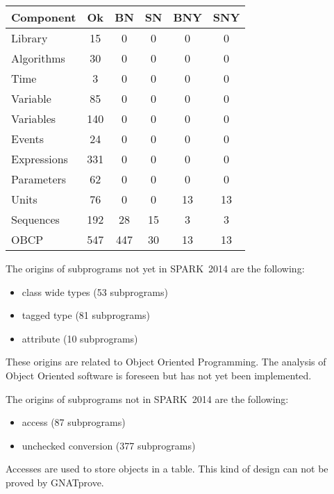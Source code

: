 \documentclass[10pt,a4paper,twocolumn]{article}
\newcommand{\gnatprove}{GNATprove\xspace}
\newcommand{\newspark}{SPARK~2014\xspace}
\begin{document}
\vspace{5mm}

\begin{tabular}{|l|c|c|c|c|c|}
\hline
Component   & Ok  & BN  & SN & BNY & SNY \\
\hline
Library     &  15 &   0 &  0 &   0 &   0 \\
\hline
Algorithms  &  30 &   0 &  0 &   0 &   0 \\
\hline
Time        &   3 &   0 &  0 &   0 &   0 \\
\hline
Variable    &  85 &   0 &  0 &   0 &   0 \\
\hline
Variables   & 140 &   0 &  0 &   0 &   0 \\
\hline
Events      &  24 &   0 &  0 &   0 &   0 \\
\hline
Expressions & 331 &   0 &  0 &   0 &   0 \\
\hline
Parameters  &  62 &   0 &  0 &   0 &   0 \\
\hline
Units       &  76 &   0 &  0 &  13 &  13 \\
\hline
Sequences   & 192 &  28 & 15 &   3 &   3 \\
\hline
OBCP        & 547 & 447 & 30 &  13 &  13 \\
\hline
\end{tabular}

\vspace{5mm}

The origins of subprograms not yet in \newspark are the following:

\begin{itemize}
\item class wide types (53 subprograms)
\item tagged type (81 subprograms)
\item attribute (10 subprograms)
\end{itemize}

These origins are related to Object Oriented Programming. The analysis of Object Oriented software is foreseen but has not yet been implemented.

The origins of subprograms not in \newspark are the following:

\begin{itemize}
\item access (87 subprograms)
\item unchecked conversion (377 subprograms)
\end{itemize}

Accesses are used to store objects in a table.
This kind of design can not be proved by \gnatprove.
\end{document}
